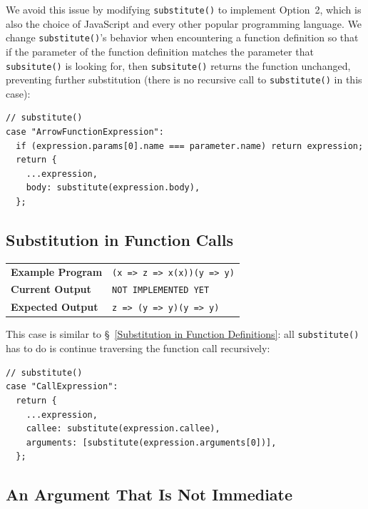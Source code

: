 \documentclass[12pt, oneside]{book}
\begin{document}
We avoid this issue by modifying \texttt{substitute()} to implement Option~2, which is also the choice of JavaScript and every other popular programming language. We change \texttt{substitute()}’s behavior when encountering a function definition so that if the parameter of the function definition matches the parameter that \texttt{subsitute()} is looking for, then \texttt{subsitute()} returns the function unchanged, preventing further substitution (there is no recursive call to \texttt{substitute()} in this case):

\begin{verbatim}
// substitute()
case "ArrowFunctionExpression":
  if (expression.params[0].name === parameter.name) return expression;
  return {
    ...expression,
    body: substitute(expression.body),
  };
\end{verbatim}

\subsection{Substitution in Function Calls}
\label{Substitution in Function Calls}

\begin{center}
\begin{tabular}{ll}
\textbf{Example Program} & \texttt{(x => z => x(x))(y => y)} \\
\textbf{Current Output} & \texttt{NOT IMPLEMENTED YET} \\
\textbf{Expected Output} & \texttt{z => (y => y)(y => y)} \\
\end{tabular}
\end{center}

This case is similar to §~\ref{Substitution in Function Definitions}: all \texttt{substitute()} has to do is continue traversing the function call recursively:

\begin{verbatim}
// substitute()
case "CallExpression":
  return {
    ...expression,
    callee: substitute(expression.callee),
    arguments: [substitute(expression.arguments[0])],
  };
\end{verbatim}

\subsection{An Argument That Is Not Immediate}
\label{An Argument That Is Not Immediate}
\end{document}
